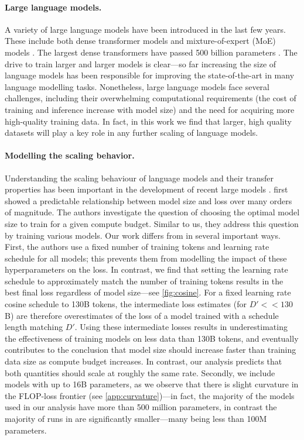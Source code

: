 \documentclass[11pt, a4paper, logo, copyright, nonumbering]{deepmind}
\begin{document}
\paragraph{Large language models.}
A variety of large language models have been introduced in the last few years.
These include both dense transformer models \citep{gpt3, jurassic, nlg530b, rae2021gopher, thoppilan2022lamda} and mixture-of-expert (MoE) models \citep{du2021glam, fedus2021switch, zoph2022designing}. 
The largest dense transformers have passed 500 billion parameters \citep{nlg530b}.
The drive to train larger and larger models is clear---so far increasing the size of language models has been responsible for improving the state-of-the-art in many language modelling tasks. 
Nonetheless, large language models face several challenges, including their overwhelming computational requirements (the cost of training and inference increase with model size) \citep{rae2021gopher, thoppilan2022lamda} and the need for acquiring more high-quality training data.
In fact, in this work we find that larger, high quality datasets will play a key role in any further scaling of language models.

\paragraph{Modelling the scaling behavior.}
Understanding the scaling behaviour of language models and their transfer properties has been important in the development of recent large models \citep{kaplan2020scaling,  hernandez2021scaling}. 
\citet{kaplan2020scaling} first showed a predictable relationship between model size and loss over many orders of magnitude.
The authors investigate the question of choosing the optimal model size to train for a given compute budget. Similar to us, they address this question by training various models.
Our work differs from \citet{kaplan2020scaling} in several important ways.
First, the authors use a fixed number of training tokens and learning rate schedule for all models; this prevents them from modelling the impact of these hyperparameters on the loss.
In contrast, we find that setting the learning rate schedule to approximately match the number of training tokens results in the best final loss regardless of model size---see \autoref{fig:cosine}.
For a fixed learning rate cosine schedule to 130B tokens, the intermediate loss estimates (for $D' << 130$B) are therefore overestimates of the loss of a model trained with a schedule length matching $D'$.
Using these intermediate losses results in underestimating the effectiveness of training models on less data than 130B tokens, and eventually contributes to the conclusion that model size should increase faster than training data size as compute budget increases.
In contrast, our analysis predicts that both quantities should scale at roughly the same rate.
Secondly, we include models with up to 16B parameters, as we observe that there is slight curvature in the FLOP-loss frontier (see \autoref{app:curvature})---in fact, the majority of the models used in our analysis have more than 500 million parameters, in contrast the majority of runs in \citet{kaplan2020scaling} are significantly smaller---many being less than 100M parameters.
\end{document}
